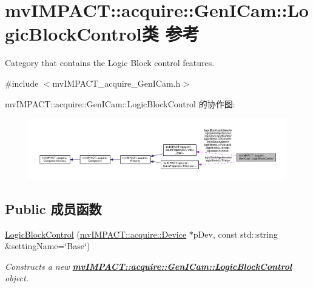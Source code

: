 \hypertarget{classmv_i_m_p_a_c_t_1_1acquire_1_1_gen_i_cam_1_1_logic_block_control}{\section{mv\+I\+M\+P\+A\+C\+T\+:\+:acquire\+:\+:Gen\+I\+Cam\+:\+:Logic\+Block\+Control类 参考}
\label{classmv_i_m_p_a_c_t_1_1acquire_1_1_gen_i_cam_1_1_logic_block_control}
}


Category that contains the Logic Block control features.  




{\ttfamily \#include $<$mv\+I\+M\+P\+A\+C\+T\+\_\+acquire\+\_\+\+Gen\+I\+Cam.\+h$>$}



mv\+I\+M\+P\+A\+C\+T\+:\+:acquire\+:\+:Gen\+I\+Cam\+:\+:Logic\+Block\+Control 的协作图\+:
\nopagebreak
\begin{figure}[H]
\begin{center}
\leavevmode
\includegraphics[width=350pt]{classmv_i_m_p_a_c_t_1_1acquire_1_1_gen_i_cam_1_1_logic_block_control__coll__graph}
\end{center}
\end{figure}
\subsection*{Public 成员函数}
\begin{DoxyCompactItemize}
\item 
\hyperlink{classmv_i_m_p_a_c_t_1_1acquire_1_1_gen_i_cam_1_1_logic_block_control_a49c914f981187804f292d7d71133a31d}{Logic\+Block\+Control} (\hyperlink{classmv_i_m_p_a_c_t_1_1acquire_1_1_device}{mv\+I\+M\+P\+A\+C\+T\+::acquire\+::\+Device} $\ast$p\+Dev, const std\+::string \&setting\+Name=\char`\"{}Base\char`\"{})
\begin{DoxyCompactList}\small\item\em Constructs a new {\bfseries \hyperlink{classmv_i_m_p_a_c_t_1_1acquire_1_1_gen_i_cam_1_1_logic_block_control}{mv\+I\+M\+P\+A\+C\+T\+::acquire\+::\+Gen\+I\+Cam\+::\+Logic\+Block\+Control}} object. \end{DoxyCompactList}\end{DoxyCompactItemize}
